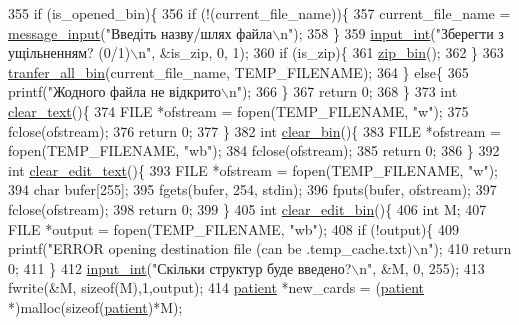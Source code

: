 \begin{DoxyCodeInclude}
{{{{{355     \textcolor{keywordflow}{if} (is\_opened\_bin)\{
356         \textcolor{keywordflow}{if} (!(current\_file\_name))\{
357             current\_file\_name = \hyperlink{lab__functions_8h_a53c0a255092a68903d4627229c37d7d0}{message\_input}(\textcolor{stringliteral}{"Введіть назву/шлях файла\(\backslash\)n"});
358         \}
359         \hyperlink{lab__functions_8h_a6f453bc035d85e967bd5032eca31a155}{input\_int}(\textcolor{stringliteral}{"Зберегти з ущільненням? (0/1)\(\backslash\)n"}, &is\_zip, 0, 1);
360         \textcolor{keywordflow}{if} (is\_zip)\{
361             \hyperlink{main_8c_a56f7f6edbc88169ca7785ff69d03396e}{zip\_bin}();
362         \}
363         \hyperlink{main_8c_a0225750ccc073d7680cae540419b124a}{tranfer\_all\_bin}(current\_file\_name, TEMP\_FILENAME);
364     \} \textcolor{keywordflow}{else}\{
365         printf(\textcolor{stringliteral}{"Жодного файла не відкрито\(\backslash\)n"});
366     \}
367     \textcolor{keywordflow}{return} 0;
368 \}
373 \textcolor{keywordtype}{int} \hyperlink{main_8c_a69f822b267f0ba6c163047774f960aa8}{clear\_text}()\{
374     FILE *ofstream = fopen(TEMP\_FILENAME, \textcolor{stringliteral}{"w"});
375     fclose(ofstream);
376     \textcolor{keywordflow}{return} 0;
377 \}
382 \textcolor{keywordtype}{int} \hyperlink{main_8c_ae4a97e0e6277901e41f56dd2cb52aeaa}{clear\_bin}()\{
383     FILE *ofstream = fopen(TEMP\_FILENAME, \textcolor{stringliteral}{"wb"});
384     fclose(ofstream);
385     \textcolor{keywordflow}{return} 0;
386 \}
392 \textcolor{keywordtype}{int} \hyperlink{main_8c_af649673615b84141d61a31bf103e436a}{clear\_edit\_text}()\{
393     FILE *ofstream = fopen(TEMP\_FILENAME, \textcolor{stringliteral}{"w"});
394     \textcolor{keywordtype}{char} bufer[255];
395     fgets(bufer, 254, stdin);
396     fputs(bufer, ofstream);
397     fclose(ofstream);
398     \textcolor{keywordflow}{return} 0;
399 \}
405 \textcolor{keywordtype}{int} \hyperlink{main_8c_aca18af51c5eba9da8b5ffabbaf06c01f}{clear\_edit\_bin}()\{
406     \textcolor{keywordtype}{int} M;
407     FILE *output = fopen(TEMP\_FILENAME, \textcolor{stringliteral}{"wb"});
408     \textcolor{keywordflow}{if} (!output)\{
409         printf(\textcolor{stringliteral}{"ERROR opening destination file (can be .temp\_cache.txt)\(\backslash\)n"});
410         \textcolor{keywordflow}{return} 0;
411     \}
412     \hyperlink{lab__functions_8h_a6f453bc035d85e967bd5032eca31a155}{input\_int}(\textcolor{stringliteral}{"Скільки структур буде введено?\(\backslash\)n"}, &M, 0, 255);
413     fwrite(&M, \textcolor{keyword}{sizeof}(M),1,output);
414     \hyperlink{structpatient__struct}{patient} *new\_cards = (\hyperlink{structpatient__struct}{patient} *)malloc(\textcolor{keyword}{sizeof}(\hyperlink{structpatient__struct}{patient})*M);
}}}}}
\end{DoxyCodeInclude}
